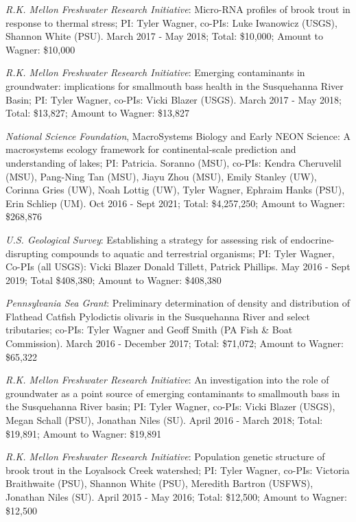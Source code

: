 \documentclass[10pt]{article}
\begin{document}
\begin{flushleft}
\begin{etaremune}
\item {\sl  R.K. Mellon Freshwater Research Initiative}: Micro-RNA profiles of brook trout in response to thermal stress; PI: Tyler Wagner, co-PIs: Luke Iwanowicz (USGS), Shannon White (PSU). March 2017 - May 2018; Total: \$10,000; Amount to Wagner: \$10,000

\item {\sl  R.K. Mellon Freshwater Research Initiative}: Emerging contaminants in groundwater: implications for smallmouth bass health in the Susquehanna River Basin; PI: Tyler Wagner, co-PIs: Vicki Blazer (USGS). March 2017 - May 2018; Total: \$13,827; Amount to Wagner: \$13,827

\item {\sl National Science Foundation}, MacroSystems Biology and Early NEON Science: A macrosystems ecology framework for continental-scale prediction and understanding of lakes; PI: Patricia. Soranno (MSU), co-PIs: Kendra Cheruvelil (MSU), Pang-Ning Tan (MSU), Jiayu Zhou (MSU), Emily Stanley (UW), Corinna Gries (UW), Noah Lottig (UW), Tyler Wagner, Ephraim Hanks (PSU), Erin Schliep (UM). Oct 2016 - Sept 2021; Total: \$4,257,250; Amount to Wagner: \$268,876

\item {\sl U.S. Geological Survey}: Establishing a strategy for assessing risk of endocrine-disrupting compounds to aquatic and terrestrial organisms; PI: Tyler Wagner, Co-PIs (all USGS): Vicki Blazer Donald Tillett, Patrick Phillips. May 2016 - Sept 2019; Total \$408,380;  Amount to Wagner: \$408,380

\item {\sl Pennsylvania Sea Grant}: Preliminary determination of density and distribution of Flathead Catfish Pylodictis olivaris in the Susquehanna River and select tributaries; co-PIs: Tyler Wagner and Geoff Smith (PA Fish \& Boat Commission). March 2016 - December 2017; Total: \$71,072;  Amount to Wagner: \$65,322

\item {\sl  R.K. Mellon Freshwater Research Initiative}: An investigation into the role of groundwater as a point source of emerging contaminants to smallmouth bass in the Susquehanna River basin; PI: Tyler Wagner, co-PIs: Vicki Blazer (USGS), Megan Schall (PSU), Jonathan Niles (SU). April 2016 - March 2018; Total: \$19,891; Amount to Wagner: \$19,891

\item {\sl  R.K. Mellon Freshwater Research Initiative}: Population genetic structure of brook trout in the Loyalsock Creek watershed; PI: Tyler Wagner, co-PIs: Victoria Braithwaite (PSU), Shannon White (PSU), Meredith Bartron (USFWS), Jonathan Niles (SU). April 2015 - May 2016; Total: \$12,500; Amount to Wagner: \$12,500


\end{etaremune}
\end{flushleft}
\end{document}
